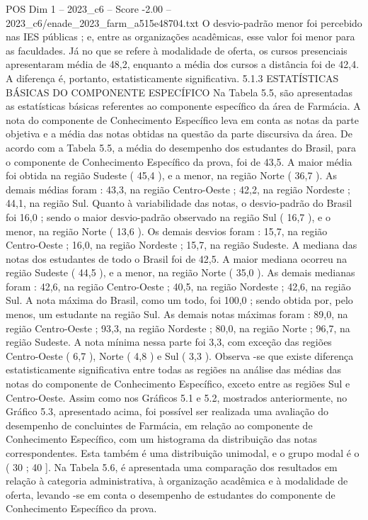 \begin{textsample}{POS Dim 1 – 2023\_c6 – Score -2.00 – 2023\_c6/enade\_2023\_farm\_a515e48704.txt}
O desvio-padrão menor foi percebido nas IES públicas ; e, entre as organizações acadêmicas, esse valor foi menor para as faculdades.
Já no que se refere à modalidade de oferta, os cursos presenciais apresentaram média de 48,2, enquanto a média dos cursos a distância foi de 42,4.
A diferença é, portanto, estatisticamente significativa. 5.1.3 ESTATÍSTICAS BÁSICAS DO COMPONENTE ESPECÍFICO Na Tabela 5.5, são apresentadas as estatísticas básicas referentes ao componente específico da área de Farmácia.
A nota do componente de Conhecimento Específico leva em conta as notas da parte objetiva e a média das notas obtidas na questão da parte discursiva da área.
De acordo com a Tabela 5.5, a média do desempenho dos estudantes do Brasil, para o componente de Conhecimento Específico da prova, foi de 43,5.
A maior média foi obtida na região Sudeste ( 45,4 ), e a menor, na região Norte ( 36,7 ).
As demais médias foram : 43,3, na região Centro-Oeste ; 42,2, na região Nordeste ; 44,1, na região Sul.
Quanto à variabilidade das notas, o desvio-padrão do Brasil foi 16,0 ; sendo o maior desvio-padrão observado na região Sul ( 16,7 ), e o menor, na região Norte ( 13,6 ).
Os demais desvios foram : 15,7, na região Centro-Oeste ; 16,0, na região Nordeste ; 15,7, na região Sudeste.
A mediana das notas dos estudantes de todo o Brasil foi de 42,5.
A maior mediana ocorreu na região Sudeste ( 44,5 ), e a menor, na região Norte ( 35,0 ).
As demais medianas foram : 42,6, na região Centro-Oeste ; 40,5, na região Nordeste ; 42,6, na região Sul.
A nota máxima do Brasil, como um todo, foi 100,0 ; sendo obtida por, pelo menos, um estudante na região Sul.
As demais notas máximas foram : 89,0, na região Centro-Oeste ; 93,3, na região Nordeste ; 80,0, na região Norte ; 96,7, na região Sudeste.
A nota mínima nessa parte foi 3,3, com exceção das regiões Centro-Oeste ( 6,7 ), Norte ( 4,8 ) e Sul ( 3,3 ).
Observa -se que existe diferença estatisticamente significativa entre todas as regiões na análise das médias das notas do componente de Conhecimento Específico, exceto entre as regiões Sul e Centro-Oeste.
Assim como nos Gráficos 5.1 e 5.2, mostrados anteriormente, no Gráfico 5.3, apresentado acima, foi possível ser realizada uma avaliação do desempenho de concluintes de Farmácia, em relação ao componente de Conhecimento Específico, com um histograma da distribuição das notas correspondentes.
Esta também é uma distribuição unimodal, e o grupo modal é o ( 30 ; 40 ].
Na Tabela 5.6, é apresentada uma comparação dos resultados em relação à categoria administrativa, à organização acadêmica e à modalidade de oferta, levando -se em conta o desempenho de estudantes do componente de Conhecimento Específico da prova.

\end{textsample}
